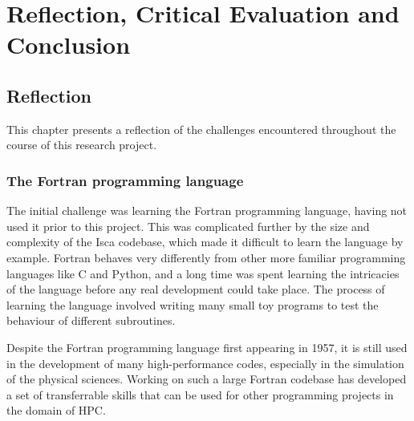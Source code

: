 \documentclass[a4paper,11pt]{report}
\begin{document}

\part{Reflection, Critical Evaluation and Conclusion}


\chapter{Reflection}
This chapter presents a reflection of the challenges encountered throughout the course of this research project. 

\section{The Fortran programming language}
The initial challenge was learning the Fortran programming language, having not used it prior to this project. This was complicated further by the size and complexity of the Isca codebase, which made it difficult to learn the language by example. Fortran behaves very differently from other more familiar programming languages like C and Python, and a long time was spent learning the intricacies of the language before any real development could take place. The process of learning the language involved writing many small toy programs to test the behaviour of different subroutines. 
\par
Despite the Fortran programming language first appearing in 1957, it is still used in the development of many high-performance codes, especially in the simulation of the physical sciences. Working on such a large Fortran codebase has developed a set of transferrable skills that can be used for other programming projects in the domain of HPC. 

%
%
%

\end{document}
